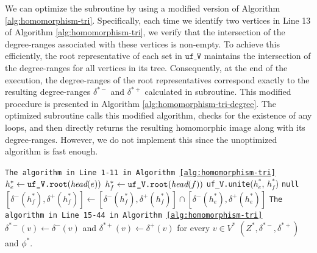 \documentclass[main.tex]{subfiles}
\begin{document}
We can optimize the \dartIdentification subroutine by using a modified version of Algorithm \ref{alg:homomorphism-tri}.
Specifically, each time we identify two vertices in Line 13 of Algorithm \ref{alg:homomorphism-tri}, we verify that the intersection of the degree-ranges associated with these vertices is non-empty.
To achieve this efficiently, the root representative of each set in $\texttt{uf\_V}$ maintains the intersection of the degree-ranges for all vertices in its tree.
Consequently, at the end of the execution, the degree-ranges of the root representatives correspond exactly to the resulting degree-ranges $\delta^{*-}$ and $\delta^{*+}$ calculated in \dartIdentification subroutine.
This modified procedure is presented in Algorithm \ref{alg:homomorphism-tri-degree}.
The optimized \dartIdentification subroutine calls this modified algorithm, checks for the existence of any loops, and then directly returns the resulting homomorphic image along with its degree-ranges.
However, we do not implement this since the unoptimized algorithm is fast enough.

\begin{algorithm}[H]
\caption{freeHomomorphismTriangulationWithDegreeIntersection($(Z,\delta^-,\delta^+)$, $\{(e_i, f_i)\}_{i=1}^k$)}
    \label{alg:homomorphism-tri-degree}
    \begin{algorithmic}[1]
        \State \texttt{The algorithm in Line 1-11 in Algorithm \ref{alg:homomorphism-tri}}
            \State $h^*_e \gets \texttt{uf\_V.root}(\textit{head}(e))$
            \State $h^*_f \gets \texttt{uf\_V.root}(\textit{head}(f))$
            \State \texttt{uf\_V.unite}($h^*_e$, $h^*_f$) 
             
                \State \Return \texttt{null} 
            \EndIf
            \State $[\delta^-(h^*_f), \delta^+(h^*_f)] \gets [\delta^-(h^*_f), \delta^+(h^*_f)] \cap [\delta^-(h^*_e), \delta^+(h^*_e)]$ 
        \EndIf
        \State \texttt{The algorithm in Line 15-44 in Algorithm \ref{alg:homomorphism-tri}}
        \State $\delta^{*-}(v) \gets \delta^-(v)$ and $\delta^{*+}(v) \gets \delta^+(v)$ for every $v \in V^*$
        \State \Return $(Z^*, \delta^{*-}, \delta^{*+})$ and $\phi^*$.
  \end{algorithmic}
\end{algorithm}
\end{document}
